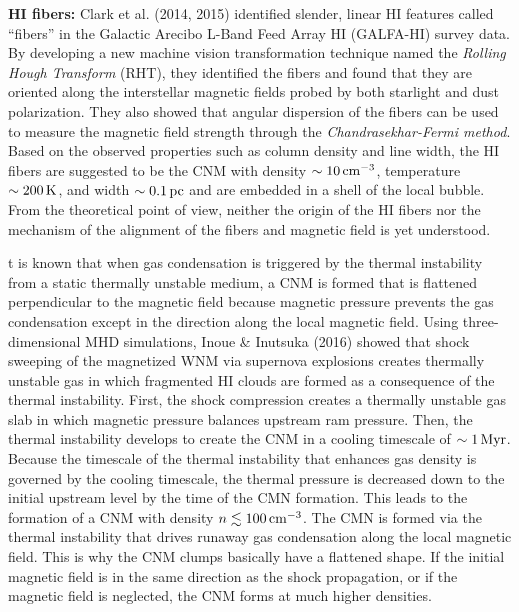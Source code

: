 \documentclass[a4paper,10pt]{article}
\begin{document}
{\noindent}\textbf{HI fibers:} Clark et al. (2014, 2015) identified slender, linear HI features called ``fibers'' in the Galactic Arecibo L-Band Feed Array HI (GALFA-HI) survey data. By developing a new machine vision transformation technique named the \textit{Rolling Hough Transform} (RHT), they identified the fibers and found that they are oriented along the interstellar magnetic fields probed by both starlight  and dust polarization. They also showed that angular dispersion of the fibers can be used to measure the magnetic field strength through the \textit{Chandrasekhar-Fermi method}. Based on the observed properties such as column density and line width, the HI fibers are suggested to be the CNM with density $\sim10\,{\rm cm^{-3}}$, temperature $\sim200\,{\rm K}$, and width $\sim0.1\,{\rm pc}$ and are embedded in a shell of the local bubble. From the theoretical point of view, neither the origin of the HI fibers nor the mechanism of the alignment of the fibers and magnetic field is yet understood.

{\noindent}t is known that when gas condensation is triggered by the thermal instability from a static thermally unstable medium, a CNM is formed that is flattened perpendicular to the magnetic field because magnetic pressure prevents the gas condensation except in the direction along the local magnetic field. Using three-dimensional MHD simulations, Inoue \& Inutsuka (2016) showed that shock sweeping of the magnetized WNM via supernova explosions creates thermally unstable gas in which fragmented HI clouds are formed as a consequence of the thermal instability. First, the shock compression creates a thermally unstable gas slab in which magnetic pressure balances upstream ram pressure. Then, the thermal instability develops to create the CNM in a cooling timescale of $\sim1\,{\rm Myr}$. Because the timescale of the thermal instability that enhances gas density is governed by the cooling timescale, the thermal pressure is decreased down to the initial upstream level by the time of the CMN formation. This leads to the formation of a CNM with density $n\lesssim100\,{\rm cm^{-3}}$. The CMN is formed via the thermal instability that drives runaway gas condensation along the local magnetic field. This is why the CNM clumps basically have a flattened shape. If the initial magnetic field is in the same direction as the shock propagation, or if the magnetic field is neglected, the CNM forms at much higher densities.
\end{document}
